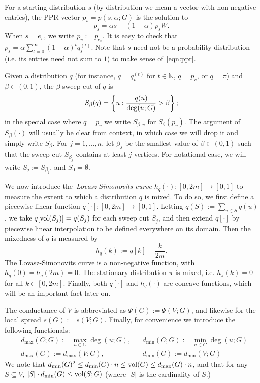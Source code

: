 For a starting distribution $s$ (by distribution we mean a vector with non-negative entries), the PPR vector $p_s = p(s,\alpha;G)$ is the solution to
\begin{equation}
\label{eqn:ppr}
p_s = \alpha s + (1 - \alpha) p_s W.
\end{equation}
When $s = e_v$, we write $p_v := p_{e_v}$. It is easy to check that $p_s = \alpha \sum_{t = 0}^{\infty} (1 - \alpha)^t q_s^{(t)}$.  Note that $s$ need not be a probability distribution (i.e. its entries need not sum to $1$) to make sense of~\eqref{eqn:ppr}.

Given a distribution $q$ (for instance, $q = q_v^{(t)}$ for $t \in \mathbb{N}$, $q = p_v$, or $q = \pi$) and $\beta \in (0,1)$, the $\beta$-sweep cut of $q$ is
\begin{equation*}
S_{\beta}(q) = \left\{u: \frac{q(u)}{\deg(u;G)} > \beta\right\};
\end{equation*} 
in the special case where $q = p_v$ we write $S_{\beta,v}$ for $S_{\beta}(p_v)$. The argument of $S_{\beta}(\cdot)$ will usually be clear from context, in which case we will drop it and simply write $S_{\beta}$. For $j = 1,\ldots,n$, let $\beta_j$ be the smallest value of $\beta \in (0,1)$ such that the sweep cut $S_{\beta_j}$ contains at least $j$ vertices. For notational ease, we will write $S_j := S_{\beta_j}$, and $S_0 = \emptyset$. 

We now introduce the~\emph{Lovasz-Simonovits curve} $h_q(\cdot): [0,2m] \to [0,1]$ to measure the extent to which a distribution $q$ is mixed. To do so, we first define a piecewise linear function $q[\cdot]: [0,2m] \to [0,1]$. Letting $q(S) := \sum_{u \in S} q(u)$, we take $q[\mathrm{vol}(S_j)] = q(S_j)$ for each sweep cut $S_j$, and then extend $q[\cdot]$ by piecewise linear interpolation to be defined everywhere on its domain. Then the mixedness of $q$ is measured by
\begin{equation*}
h_q(k) := q[k] - \frac{k}{2m}.
\end{equation*}
The Lovasz-Simonovits curve is a non-negative function, with $h_q(0) = h_q(2m) = 0$. The stationary distribution $\pi$ is mixed, i.e. $h_{\pi}(k) = 0$ for all $k \in [0,2m]$. Finally, both $q[\cdot]$ and $h_q(\cdot)$ are concave functions, which will be an important fact later on.  

The conductance of $V$ is abbreviated as $\Psi(G) := \Psi(V;G)$, and likewise for the local spread $s(G) := s(V;G)$. Finally, for convenience we introduce the following functionals:
\begin{equation*}
\begin{aligned}
& d_{\max}(C; G) := \max_{u \in C} \deg(u; G), && d_{\min}(C; G) := \min_{u \in C} \deg(u;G) \\
& d_{\max}(G) := d_{\max}(V;G),~~ && d_{\min}(G) := d_{\min}(V; G)
\end{aligned}
\end{equation*}
We note that $d_{\min}(G)^2 \leq d_{\min}(G) \cdot n \leq \mathrm{vol}(G) \leq d_{\max}(G) \cdot n$, and that for any $S \subseteq V$, $|S| \cdot d_{\min}(G) \leq \mathrm{vol}(S;G)$ (where $|S|$ is the cardinality of $S$.)

